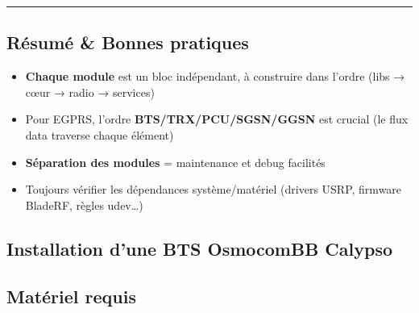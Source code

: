 \documentclass[
]{article}
\newenvironment{Shaded}{\begin{snugshade}}{\end{snugshade}}
\newcommand{\BuiltInTok}[1]{#1}
\newcommand{\CommentTok}[1]{\textcolor[rgb]{0.56,0.35,0.01}{\textit{#1}}}
\newcommand{\ExtensionTok}[1]{#1}
\newcommand{\FunctionTok}[1]{\textcolor[rgb]{0.13,0.29,0.53}{\textbf{#1}}}
\newcommand{\KeywordTok}[1]{\textcolor[rgb]{0.13,0.29,0.53}{\textbf{#1}}}
\newcommand{\StringTok}[1]{\textcolor[rgb]{0.31,0.60,0.02}{#1}}
\newcommand{\VariableTok}[1]{\textcolor[rgb]{0.00,0.00,0.00}{#1}}
\providecommand{\tightlist}{%
  \setlength{\itemsep}{0pt}\setlength{\parskip}{0pt}}
\begin{document}
\begin{Shaded}
\end{Shaded}

\begin{center}\rule{0.5\linewidth}{0.5pt}\end{center}

\subsection{Résumé \& Bonnes
pratiques}\label{ruxe9sumuxe9-bonnes-pratiques}

\begin{itemize}
\tightlist
\item
  \textbf{Chaque module} est un bloc indépendant, à construire dans
  l'ordre (libs → cœur → radio → services)
\item
  Pour EGPRS, l'ordre \textbf{BTS/TRX/PCU/SGSN/GGSN} est crucial (le
  flux data traverse chaque élément)
\item
  \textbf{Séparation des modules} = maintenance et debug facilités
\item
  Toujours vérifier les dépendances système/matériel (drivers USRP,
  firmware BladeRF, règles udev\ldots)
\end{itemize}

\subsection{Installation d'une BTS OsmocomBB
Calypso}\label{installation-dune-bts-osmocombb-calypso}

\subsection{Matériel requis}\label{matuxe9riel-requis}
\end{document}

